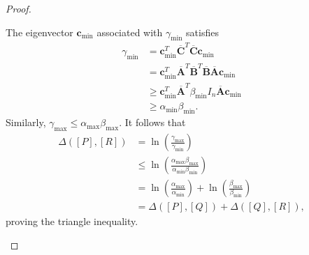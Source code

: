 \documentclass[10pt,a4paper]{amsart}
\begin{document}
\begin{proof}
\begin{enumerate}
    The eigenvector $\mathbf{c}_{\min}$ associated with $\gamma_{\min}$ satisfies  
    \begin{align*}
        \gamma_{\min} &= \mathbf{c}_{\min}^T \overline{\mathbf{C}}^T \overline{\mathbf{C}} \mathbf{c}_{\min}\\
        &= \mathbf{c}_{\min}^T \overline{\mathbf{A}}^T \overline{\mathbf{B}}^T \overline{\mathbf{B}} \overline{\mathbf{A}} \mathbf{c}_{\min}\\
        &\geq \mathbf{c}_{\min}^T \overline{\mathbf{A}}^T \beta_{\min} I_n \overline{\mathbf{A}} \mathbf{c}_{\min}\\
        &\geq \alpha_{\min} \beta_{\min}.
    \end{align*}
    Similarly, $\gamma_{\max} \leq \alpha_{\max} \beta_{\max}$. It follows that  
    \begin{align*}
        \Delta([P], [R]) &= \ln \left(\frac{\gamma_{\max}}{\gamma_{\min}}\right)\\
        &\leq \ln \left(\frac{\alpha_{\max} \beta_{\max}}{\alpha_{\min} \beta_{\min}}\right)\\
        &= \ln \left(\frac{\alpha_{\max}}{\alpha_{\min}}\right) + \ln \left(\frac{\beta_{\max}}{\beta_{\min}}\right)\\
        &= \Delta([P], [Q]) + \Delta([Q], [R]),
    \end{align*}
    proving the triangle inequality.
\end{enumerate}
\end{proof}
\end{document}
